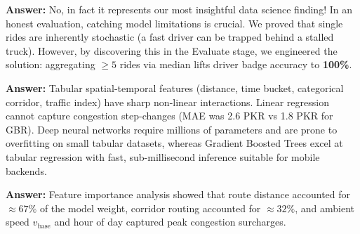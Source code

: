 \documentclass[10pt, a4paper]{article}
\begin{document}
\begin{qa}[Q2: In Table 5, Single-Ride Pace is marked `Not Met' (\(F_1 = 0.71\) vs. 0.88). Does that mean your pace model failed?]
\footnotesize
\textbf{Answer:} No, in fact it represents our most insightful data science finding! In an honest evaluation, catching model limitations is crucial. We proved that single rides are inherently stochastic (a fast driver can be trapped behind a stalled truck). However, by discovering this in the Evaluate stage, we engineered the solution: aggregating \(\ge 5\) rides via median lifts driver badge accuracy to \textbf{100\%}.
\end{qa}

\begin{qa}
\footnotesize
\textbf{Answer:} Tabular spatial-temporal features (distance, time bucket, categorical corridor, traffic index) have sharp non-linear interactions. Linear regression cannot capture congestion step-changes (MAE was 2.6 PKR vs 1.8 PKR for GBR). Deep neural networks require millions of parameters and are prone to overfitting on small tabular datasets, whereas Gradient Boosted Trees excel at tabular regression with fast, sub-millisecond inference suitable for mobile backends.
\end{qa}

\begin{qa}
\footnotesize
\textbf{Answer:} Feature importance analysis showed that route distance accounted for \(\approx 67\%\) of the model weight, corridor routing accounted for \(\approx 32\%\), and ambient speed \(v_{\mathrm{base}}\) and hour of day captured peak congestion surcharges.
\end{qa}
\end{document}
